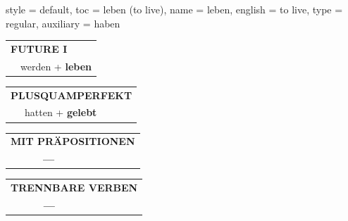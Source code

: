 \begin{verbentry}{
  style = {default},
  toc = {leben (to live)},
  name = {leben},
  english = {to live},
  type = {regular},
  auxiliary = {haben}
}
\begin{tabular}{rl}
    \multicolumn{2}{l}{\textbf{FUTURE I} }\\
   & werden + \textbf{leben}\\
 
  \end{tabular}
\hfill
   \begin{tabular}{rl}
      \multicolumn{2}{l}{\textbf{PLUSQUAMPERFEKT}}\\
  &  hatten + \textbf{gelebt}\\
  \end{tabular}
  
  \vspace{10pt}

\begin{tabular}{lll}
\multicolumn{3}{l}{\textbf{MIT PRÄPOSITIONEN}}\\
& \textbf{---} & \\
\end{tabular}
\hfill
\begin{tabular}{lll}
\multicolumn{3}{l}{\textbf{TRENNBARE VERBEN}}\\
& \textbf{---} & \\
\end{tabular}

  \vspace{-5pt}
\end{verbentry}

